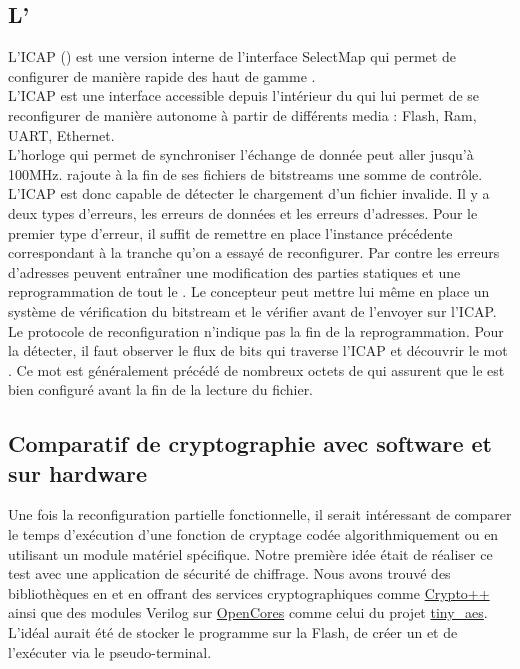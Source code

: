 
\subsection{L'}

L'ICAP () est une version interne de l'interface SelectMap qui permet de configurer de manière rapide des \fpgas{} haut de gamme .\\
L'ICAP est une interface accessible depuis l'intérieur du \fpga{} qui lui permet de se reconfigurer de manière autonome à partir de différents media : Flash, Ram, UART, Ethernet.\\
L'horloge qui permet de synchroniser l'échange de donnée peut aller jusqu'à 100MHz.  rajoute à la fin de ses fichiers de bitstreams une somme de contrôle. L'ICAP est donc capable de détecter le chargement d'un fichier invalide. Il y a deux types d'erreurs, les erreurs de données et les erreurs d'adresses. Pour le premier type d'erreur, il suffit de remettre en place l'instance précédente correspondant à la tranche qu'on a essayé de reconfigurer. Par contre les erreurs d'adresses peuvent entraîner une modification des parties statiques et une reprogrammation de tout le \fpga{}. Le concepteur peut mettre lui même en place un système de vérification du bitstream et le vérifier avant de l'envoyer sur l'ICAP.\\
Le protocole de reconfiguration n'indique pas la fin de la reprogrammation. Pour la détecter, il faut observer le flux de bits qui traverse l'ICAP et découvrir le mot . Ce mot est généralement précédé de nombreux octets de  qui assurent que le \fpga{} est bien configuré avant la fin de la lecture du fichier.

\subsection{Comparatif de cryptographie avec software et sur hardware}

Une fois la reconfiguration partielle fonctionnelle, il serait intéressant de comparer le temps d'exécution d'une fonction de cryptage codée algorithmiquement ou en utilisant un module matériel spécifique. Notre première idée était de réaliser ce test avec une application de sécurité de chiffrage. Nous avons trouvé des bibliothèques en  et en  offrant des services cryptographiques comme \href{http://www.cryptopp.com/}{Crypto++} ainsi que des modules Verilog sur \href{http://opencores.org/}{OpenCores} comme celui du projet \href{http://opencores.org/project,tiny_aes}{tiny\_aes}. L'idéal aurait été de stocker le programme  sur la Flash, de créer un  et de l'exécuter via le pseudo-terminal.

